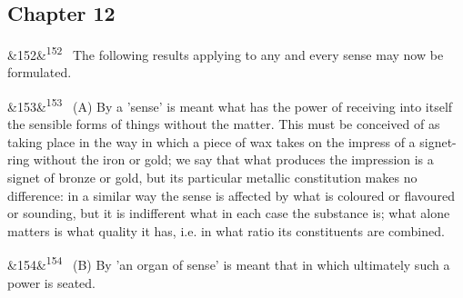 \documentclass[12pt]{article}
\newcommand{\para}[1][]{\par\noindent\ifx&#1&\else\textsuperscript{\footnotesize #1}~\fi}
\begin{document}
\subsection*{Chapter 12}

\para[152] The following results applying to any and every sense may now be formulated.

\para[153] (A) By a 'sense' is meant what has the power of receiving into itself the sensible forms of things without the matter. This must be conceived of as taking place in the way in which a piece of wax takes on the impress of a signet-ring without the iron or gold; we say that what produces the impression is a signet of bronze or gold, but its particular metallic constitution makes no difference: in a similar way the sense is affected by what is coloured or flavoured or sounding, but it is indifferent what in each case the substance is; what alone matters is what quality it has, i.e. in what ratio its constituents are combined.

\para[154] (B) By 'an organ of sense' is meant that in which ultimately such a power is seated.
\end{document}
